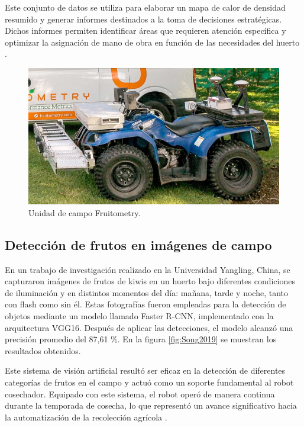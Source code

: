 Este conjunto de datos se utiliza para elaborar un mapa de calor de densidad resumido y generar informes destinados a la toma de decisiones estratégicas. Dichos informes permiten identificar áreas que requieren atención específica y optimizar la asignación de mano de obra en función de las necesidades del huerto \citep{WEBSITE:Fruitometry2024}.

\vspace{1cm}
\begin{figure}[htbp]
	\centering
	\includegraphics[width=.6\textwidth]{./Figures/Fruitometry.png}
	\caption{Unidad de campo Fruitometry\protect\footnotemark.}
	\label{fig:Fruitometry}
\end{figure}
\vspace{1cm}


\subsection{Detección de frutos en imágenes de campo}

En un trabajo de investigación realizado en la Universidad Yangling, China, se capturaron imágenes de frutos de kiwis en un huerto bajo diferentes condiciones de iluminación y en distintos momentos del día: mañana, tarde y noche, tanto con flash como sin él. Estas fotografías fueron empleadas para la detección de objetos mediante un modelo llamado Faster R-CNN, implementado con la arquitectura VGG16. Después de aplicar las detecciones, el modelo alcanzó una precisión promedio del 87,61 \%. En la figura \ref{fig:Song2019} se muestran los resultados obtenidos.

Este sistema de visión artificial resultó ser eficaz en la detección de diferentes categorías de frutos en el campo y actuó como un soporte fundamental al robot cosechador. Equipado con este sistema, el robot operó de manera continua durante la temporada de cosecha, lo que representó un avance significativo hacia la automatización de la recolección agrícola \citep{Song2019}.

